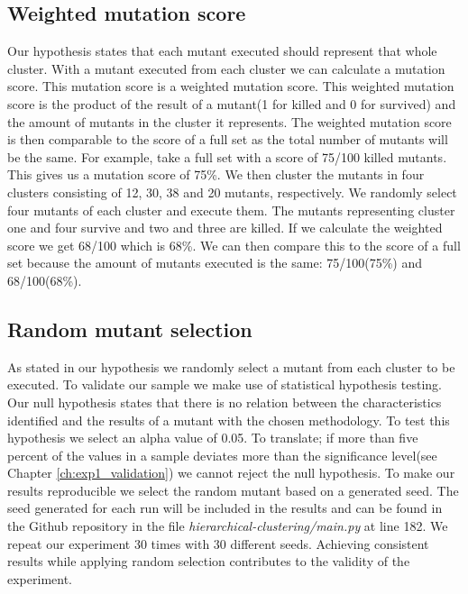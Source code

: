 \documentclass[conference,draftclsnofoot,onecolumn]{IEEEtran}
\begin{document}
\subsection{Weighted mutation score}
\label{ch:weighted_score}
Our hypothesis states that each mutant executed should represent that whole cluster.
With a mutant executed from each cluster we can calculate a mutation score.
This mutation score is a weighted mutation score.
This weighted mutation score is the product of the result of a mutant(1 for killed and 0 for survived) and the amount of mutants in the cluster it represents.
The weighted mutation score is then comparable to the score of a full set as the total number of mutants will be the same.
\newline
For example, take a full set with a score of 75/100 killed mutants.
This gives us a mutation score of 75\%. 
We then cluster the mutants in four clusters consisting of 12, 30, 38 and 20 mutants, respectively.
We randomly select four mutants of each cluster and execute them.
The mutants representing cluster one and four survive and two and three are killed.
If we calculate the weighted score we get 68/100 which is 68\%.
We can then compare this to the score of a full set because the amount of mutants executed is the same: 75/100(75\%) and 68/100(68\%).

\subsection{Random mutant selection}
\label{ch:mutant_selection}
As stated in our hypothesis we randomly select a mutant from each cluster to be executed.
To validate our sample we make use of statistical hypothesis testing\cite{Emmert-Streib2019UnderstandingInference}. Our null hypothesis states that there is no relation between the characteristics identified and the results of a mutant with the chosen methodology.
To test this hypothesis we select an alpha value of 0.05.
To translate; if more than five percent of the values in a sample deviates more than the significance level(see Chapter \ref{ch:exp1_validation}) we cannot reject the null hypothesis.
To make our results reproducible we select the random mutant based on a generated seed.
The seed generated for each run will be included in the results and can be found in the Github repository in the file \textit{hierarchical-clustering/main.py} at line 182\cite{rbasarat-repo}.
We repeat our experiment 30 times with 30 different seeds.
Achieving consistent results while applying random selection contributes to the validity of the experiment.
\end{document}
